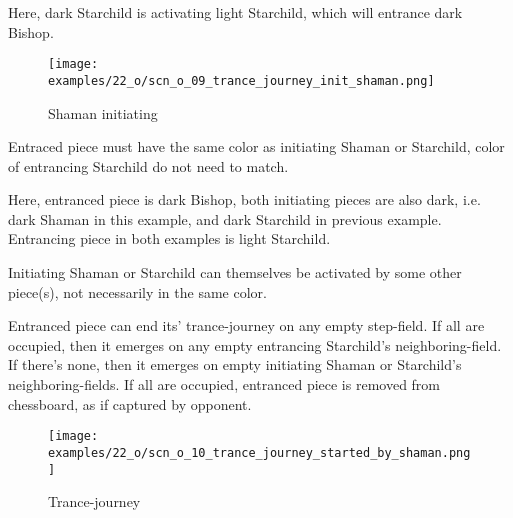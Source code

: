 Here, dark Starchild is activating light Starchild, which will entrance dark Bishop.

\noindent
\begin{wrapfigure}[10]{l}{0.4\textwidth}
\centering
\texttt{[image: examples/22\_o/scn\_o\_09\_trance\_journey\_init\_shaman.png]}
\caption{Shaman initiating}
\label{fig:scn_o_09_trance_journey_init_shaman}
\end{wrapfigure}
Entraced piece must have the same color as initiating Shaman or Starchild, color of
entrancing Starchild do not need to match.

Here, entranced piece is dark Bishop, both initiating pieces are also dark, i.e. dark Shaman
in this example, and dark Starchild in previous example. Entrancing piece in both examples
is light Starchild.

Initiating Shaman or Starchild can themselves be activated by some other piece(s),
not necessarily in the same color.



Entranced piece can end its' trance-journey on any empty step-field. If all are occupied, then it emerges
on any empty entrancing Starchild's neighboring-field. If there's none, then it emerges on empty initiating
Shaman or Starchild's neighboring-fields. If all are occupied, entranced piece is removed from chessboard,
as if captured by opponent.

\clearpage %

\vspace*{-3.1\baselineskip}
\noindent
\begin{figure}[!h]
\texttt{[image: examples/22\_o/scn\_o\_10\_trance\_journey\_started\_by\_shaman.png]}
\caption{Trance-journey}
\label{fig:scn_o_10_trance_journey_started_by_shaman}
\end{figure}

